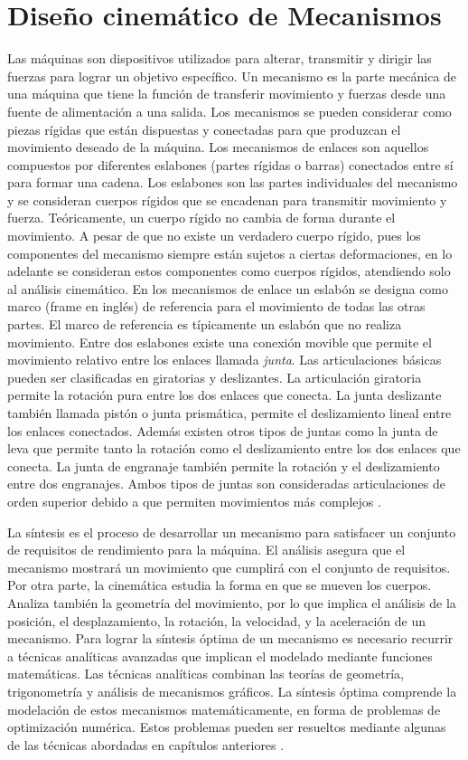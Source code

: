 \section{Diseño cinemático de Mecanismos}
Las máquinas son dispositivos utilizados para alterar, transmitir y dirigir las fuerzas para lograr un objetivo específico. Un mecanismo es la parte mecánica de una máquina que tiene la función de transferir movimiento y fuerzas desde una fuente de alimentación a una salida. Los mecanismos se pueden considerar como piezas rígidas que están dispuestas y conectadas para que produzcan el movimiento deseado de la máquina. Los mecanismos de enlaces son aquellos compuestos por diferentes eslabones (partes rígidas o barras) conectados entre sí para formar una cadena. Los eslabones son las partes individuales del mecanismo y se consideran cuerpos rígidos que se encadenan  para transmitir movimiento y fuerza. Teóricamente, un cuerpo rígido no cambia de forma durante el movimiento. A pesar de que no existe un verdadero cuerpo rígido, pues los componentes del mecanismo siempre están sujetos a ciertas deformaciones, en lo adelante se consideran estos componentes como cuerpos rígidos, atendiendo solo al análisis cinemático. En los mecanismos de enlace un eslabón se designa como marco (frame en inglés) de referencia para el movimiento de todas las otras partes. El marco de referencia es típicamente un eslabón que no realiza movimiento. Entre dos eslabones existe una conexión movible que permite el movimiento relativo entre los enlaces llamada \textit{junta}. Las articulaciones básicas pueden ser clasificadas en giratorias y deslizantes. La articulación giratoria permite la rotación pura entre los dos enlaces que conecta. La junta deslizante también llamada pistón o junta prismática, permite el deslizamiento lineal entre los enlaces conectados. Además existen otros tipos de juntas como la junta de leva que permite tanto la rotación como el deslizamiento entre los dos enlaces que conecta. La junta de engranaje también permite la rotación y el deslizamiento entre dos engranajes. Ambos tipos de juntas son consideradas articulaciones de orden superior debido a que permiten movimientos más complejos \cite{myszka2004machines}.

La síntesis es el proceso de desarrollar un mecanismo para satisfacer un conjunto de requisitos de rendimiento para la máquina. El análisis asegura que el mecanismo mostrará un movimiento que cumplirá con el conjunto de requisitos. Por otra parte, la cinemática estudia la forma en que se mueven los cuerpos. Analiza también la geometría del movimiento, por lo que implica el análisis de la posición, el desplazamiento, la rotación, la velocidad, y la aceleración de un mecanismo. Para lograr la síntesis óptima de un mecanismo es necesario recurrir a técnicas analíticas avanzadas que implican el modelado mediante funciones matemáticas. Las técnicas analíticas combinan las teorías de geometría, trigonometría y análisis de mecanismos gráficos. La síntesis óptima comprende la modelación de estos mecanismos matemáticamente, en forma de problemas de optimización numérica. Estos problemas pueden ser resueltos mediante algunas de las técnicas abordadas en capítulos anteriores \cite{myszka2004machines}. 


